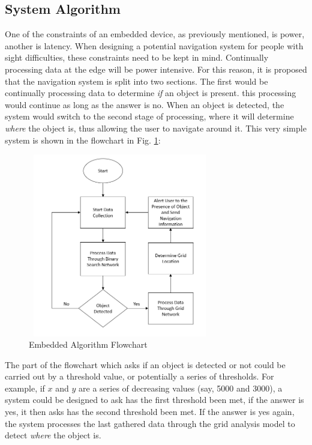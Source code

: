 \documentclass[conference]{IEEEtran}
\begin{document}
\subsection{System Algorithm}
One of the constraints of an embedded device, as previously mentioned, is power, another is latency. When designing a potential navigation system for people with sight difficulties, these constraints need to be kept in mind. Continually processing data at the edge will be power intensive. For this reason, it is proposed that the navigation system is split into two sections. The first would be continually processing data to determine \textit{if} an object is present. this processing would continue as long as the answer is no. When an object is detected, the system would switch to the second stage of processing, where it will determine \textit{where} the object is, thus allowing the user to navigate around it. This very simple system is shown in the flowchart in Fig. \ref{fig:embedded_algo_flowchart}:

\begin{figure}[ht]
\includegraphics[width=8cm, height=8cm]{images/embedded_algo_flowchart.png}
\centering
\caption{Embedded Algorithm Flowchart}
\label{fig:embedded_algo_flowchart}
\end{figure}

The part of the flowchart which asks if an object is detected or not could be carried out by a threshold value, or potentially a series of thresholds. For example, if $x$ and $y$ are a series of decreasing values (say, 5000 and 3000), a system could be designed to ask has the first threshold been met, if the answer is yes, it then asks has the second threshold been met. If the answer is yes again, the system processes the last gathered data through the grid analysis model to detect \textit{where} the object is. 
\end{document}
